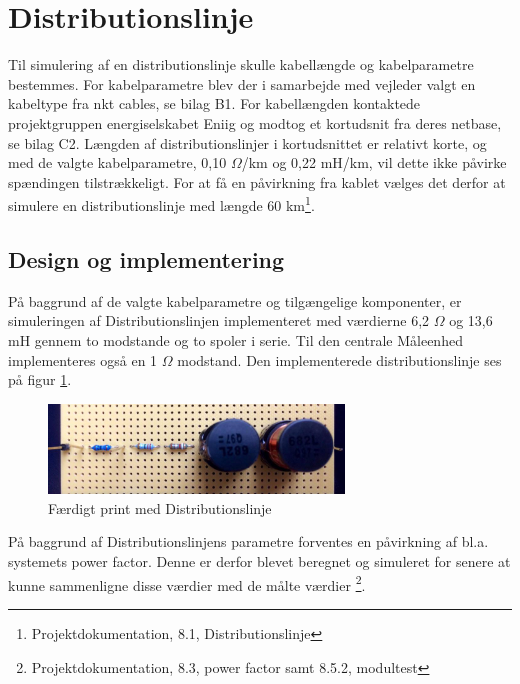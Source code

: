 
\section{Distributionslinje}

Til simulering af en distributionslinje skulle kabellængde og kabelparametre bestemmes. For kabelparametre blev der i samarbejde med vejleder valgt en kabeltype fra nkt cables, se bilag B1. For kabellængden kontaktede projektgruppen energiselskabet Eniig og modtog et kortudsnit fra deres netbase, se bilag C2. Længden af distributionslinjer i kortudsnittet er relativt korte, og med de valgte kabelparametre, 0,10 $\Omega$/km og 0,22 mH/km, vil dette ikke påvirke spændingen tilstrækkeligt. For at få en påvirkning fra kablet vælges det derfor at simulere en distributionslinje med længde 60 km\footnote{Projektdokumentation, 8.1, Distributionslinje}.  

\subsection{Design og implementering}

På baggrund af de valgte kabelparametre og tilgængelige komponenter, er simuleringen af Distributionslinjen implementeret med værdierne 6,2 $\Omega$ og 13,6 mH gennem to modstande og to spoler i serie. Til den centrale Måleenhed implementeres også en 1 $\Omega$ modstand. Den implementerede distributionslinje ses på figur \ref{fig:DisbLinje}.

\begin{figure}[H]
	\centering
	\includegraphics[width=0.7\textwidth]{figure/Distributionslinje}
	\caption{Færdigt print med Distributionslinje}
	\label{fig:DisbLinje}
\end{figure}

På baggrund af Distributionslinjens parametre forventes en påvirkning af bl.a. systemets power factor. Denne er derfor blevet beregnet og simuleret for senere at kunne sammenligne disse værdier med de målte værdier \footnote{Projektdokumentation, 8.3, power factor samt 8.5.2, modultest}. 